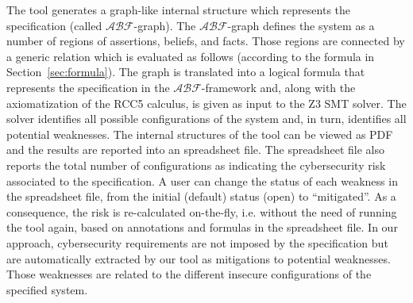 \documentclass[conference]{IEEEtran}
\newcommand{\assertionRegion}{\mathcal{A}}
\newcommand{\beliefRegion}{\mathcal{B}}
\newcommand{\factRegion}{\mathcal{F}}
\newcommand{\abftheory}{\assertionRegion\beliefRegion\factRegion}
\begin{document}
The tool generates a graph-like internal structure which represents
the specification (called $\abftheory$-graph). The $\abftheory$-graph defines the system as
a number of regions of assertions, beliefs, and facts. Those regions
are connected by a generic relation which is evaluated as follows (according to
the formula in Section~\ref{sec:formula}).
The graph is translated into 
a logical formula that represents the specification in the $\abftheory$-framework and,
along with the axiomatization of the RCC5 calculus, is given as input to the Z3 SMT solver.
The solver identifies all possible configurations of the system and, in turn,
identifies all potential weaknesses. 
The internal structures of the tool
can be viewed as PDF and the results are reported into an spreadsheet file.
The spreadsheet file also reports the total number of configurations as indicating
the cybersecurity risk associated to the specification. A user can change the status
of each weakness in the spreadsheet file, from the initial (default) status (open)
to ``mitigated''. As a consequence, the risk is re-calculated on-the-fly, i.e.
without the need of running the tool again, based on annotations and formulas 
in the spreadsheet file.
In our approach, cybersecurity requirements are not imposed by the
specification but are automatically extracted by our tool as mitigations to potential weaknesses.
Those weaknesses are related to the different insecure configurations 
of the specified system. 
\end{document}
